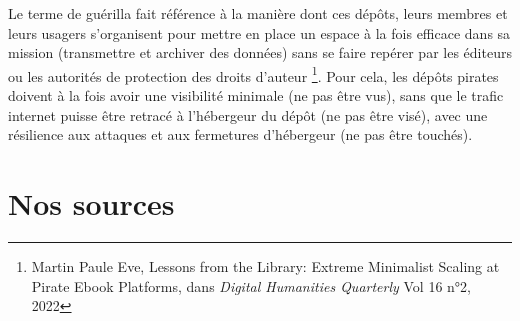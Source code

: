 Le terme de guérilla fait référence à la manière dont ces dépôts, leurs membres et leurs usagers s'organisent pour mettre en place un espace à la fois efficace dans sa mission (transmettre et archiver des données) sans se faire repérer par les éditeurs ou les autorités de protection des droits d'auteur \footnote{Martin Paule Eve, Lessons from the Library: Extreme Minimalist Scaling at Pirate Ebook Platforms, dans \textit{Digital Humanities Quarterly} Vol 16 n°2, 2022}. Pour cela, les dépôts pirates doivent à la fois avoir une visibilité minimale (ne pas être vus), sans que le trafic internet puisse être retracé à l'hébergeur du dépôt (ne pas être visé), avec une résilience aux attaques et aux fermetures d'hébergeur (ne pas être touchés).

\section{Nos sources}

